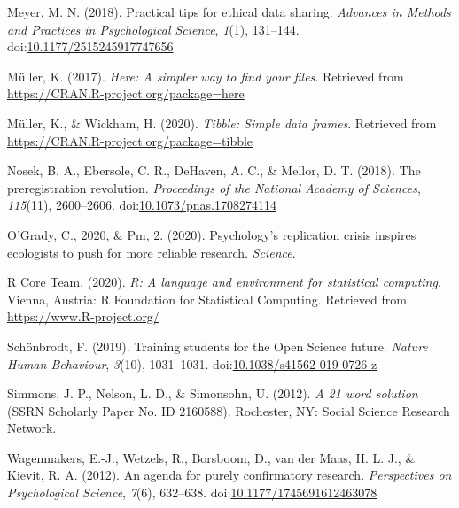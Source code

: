 \documentclass[
  man,mask,floatsintext]{apa6}
\newlength{\cslhangindent}
\newenvironment{cslreferences}%
  {\setlength{\parindent}{0pt}%
  \everypar{\setlength{\hangindent}{\cslhangindent}}\ignorespaces}%
  {\par}
\begin{document}
\begin{cslreferences}
\leavevmode\hypertarget{ref-meyerPracticalTipsEthical2018}{}%
Meyer, M. N. (2018). Practical tips for ethical data sharing. \emph{Advances in Methods and Practices in Psychological Science}, \emph{1}(1), 131--144. doi:\href{https://doi.org/10.1177/2515245917747656}{10.1177/2515245917747656}

\leavevmode\hypertarget{ref-R-here}{}%
Müller, K. (2017). \emph{Here: A simpler way to find your files}. Retrieved from \url{https://CRAN.R-project.org/package=here}

\leavevmode\hypertarget{ref-R-tibble}{}%
Müller, K., \& Wickham, H. (2020). \emph{Tibble: Simple data frames}. Retrieved from \url{https://CRAN.R-project.org/package=tibble}

\leavevmode\hypertarget{ref-nosekPreregistrationRevolution2018}{}%
Nosek, B. A., Ebersole, C. R., DeHaven, A. C., \& Mellor, D. T. (2018). The preregistration revolution. \emph{Proceedings of the National Academy of Sciences}, \emph{115}(11), 2600--2606. doi:\href{https://doi.org/10.1073/pnas.1708274114}{10.1073/pnas.1708274114}

\leavevmode\hypertarget{ref-ogradyPsychologyReplicationCrisis2020}{}%
O'Grady, C., 2020, \& Pm, 2. (2020). Psychology's replication crisis inspires ecologists to push for more reliable research. \emph{Science}.

\leavevmode\hypertarget{ref-R-base}{}%
R Core Team. (2020). \emph{R: A language and environment for statistical computing}. Vienna, Austria: R Foundation for Statistical Computing. Retrieved from \url{https://www.R-project.org/}

\leavevmode\hypertarget{ref-schonbrodtTrainingStudentsOpen2019}{}%
Schönbrodt, F. (2019). Training students for the Open Science future. \emph{Nature Human Behaviour}, \emph{3}(10), 1031--1031. doi:\href{https://doi.org/10.1038/s41562-019-0726-z}{10.1038/s41562-019-0726-z}

\leavevmode\hypertarget{ref-simmons21WordSolution2012}{}%
Simmons, J. P., Nelson, L. D., \& Simonsohn, U. (2012). \emph{A 21 word solution} (SSRN Scholarly Paper No. ID 2160588). Rochester, NY: Social Science Research Network.

\leavevmode\hypertarget{ref-wagenmakersAgendaPurelyConfirmatory2012}{}%
Wagenmakers, E.-J., Wetzels, R., Borsboom, D., van der Maas, H. L. J., \& Kievit, R. A. (2012). An agenda for purely confirmatory research. \emph{Perspectives on Psychological Science}, \emph{7}(6), 632--638. doi:\href{https://doi.org/10.1177/1745691612463078}{10.1177/1745691612463078}


\end{cslreferences}
\end{document}
